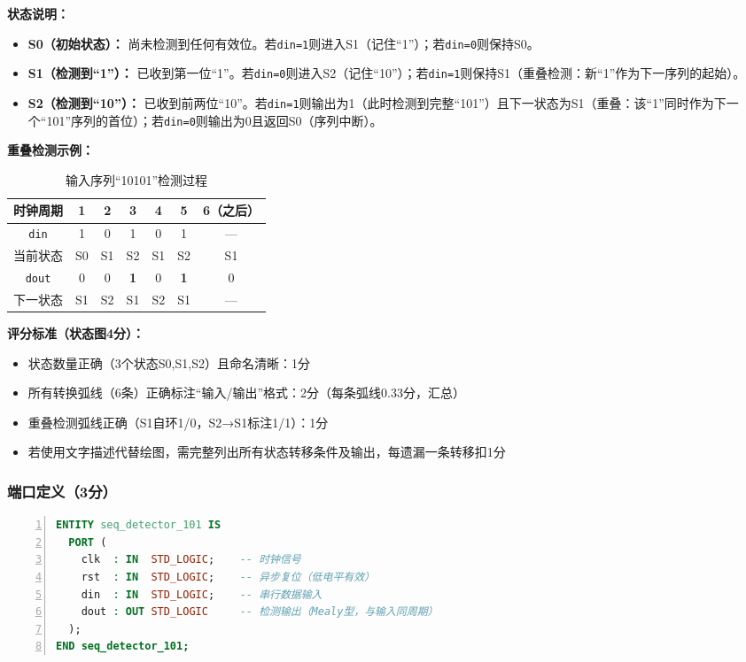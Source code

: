 \textbf{状态说明：}
\begin{itemize}[leftmargin=*,itemsep=0pt]
\item \textbf{S0（初始状态）：} 尚未检测到任何有效位。若\texttt{din=1}则进入S1（记住“1”）；若\texttt{din=0}则保持S0。
\item \textbf{S1（检测到“1”）：} 已收到第一位“1”。若\texttt{din=0}则进入S2（记住“10”）；若\texttt{din=1}则保持S1（重叠检测：新“1”作为下一序列的起始）。
\item \textbf{S2（检测到“10”）：} 已收到前两位“10”。若\texttt{din=1}则输出为1（此时检测到完整“101”）且下一状态为S1（重叠：该“1”同时作为下一个“101”序列的首位）；若\texttt{din=0}则输出为0且返回S0（序列中断）。
\end{itemize}

\textbf{重叠检测示例：}
\begin{table}[h!]
\centering
\caption{输入序列“10101”检测过程}
\begin{tabular}{|c|c|c|c|c|c|c|}
\hline
时钟周期 & 1 & 2 & 3 & 4 & 5 & 6（之后） \\
\hline
\texttt{din} & 1 & 0 & 1 & 0 & 1 & — \\
\hline
当前状态 & S0 & S1 & S2 & S1 & S2 & S1 \\
\hline
\texttt{dout} & 0 & 0 & \textbf{1} & 0 & \textbf{1} & 0 \\
\hline
下一状态 & S1 & S2 & S1 & S2 & S1 & — \\
\hline
\end{tabular}
\end{table}

\textbf{评分标准（状态图4分）：}
\begin{itemize}[leftmargin=*,itemsep=0pt]
\item 状态数量正确（3个状态S0,S1,S2）且命名清晰：1分
\item 所有转换弧线（6条）正确标注“输入/输出”格式：2分（每条弧线0.33分，汇总）
\item 重叠检测弧线正确（S1自环1/0，S2→S1标注1/1）：1分
\item 若使用文字描述代替绘图，需完整列出所有状态转移条件及输出，每遗漏一条转移扣1分
\end{itemize}

\subsubsection*{端口定义（3分）}

\begin{lstlisting}[language=VHDL,numbers=left,label={lst:fsm101_port}]
ENTITY seq_detector_101 IS
  PORT (
    clk  : IN  STD_LOGIC;    -- 时钟信号
    rst  : IN  STD_LOGIC;    -- 异步复位（低电平有效）
    din  : IN  STD_LOGIC;    -- 串行数据输入
    dout : OUT STD_LOGIC     -- 检测输出（Mealy型，与输入同周期）
  );
END seq_detector_101;
\end{lstlisting}

